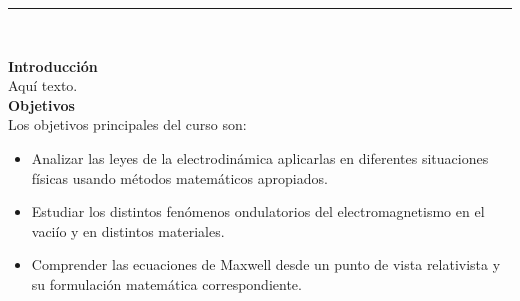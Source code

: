 \documentclass[letterpaper,10pt,onecolumn]{article}
\begin{document}




\noindent\rule{\textwidth}{1pt}\\[-0.1cm]

\addtocounter{mysection}{1}

\noindent\textbf{\large {} \quad Introducci\'on}\\[-0.2cm]


\noindent\normalsize Aqu\'i texto.\\[0.1cm]

\noindent\textbf{\large {} \quad Objetivos}\\[-0.2cm]

\noindent\normalsize Los objetivos principales del curso son:

\begin{itemize}
	\item Analizar las leyes de la electrodin\'amica aplicarlas en
          diferentes situaciones f\'isicas usando m\'etodos
          matem\'aticos apropiados.\\[-0.6cm] 
	\item Estudiar los distintos fen\'omenos ondulatorios del
          electromagnetismo en el vaci\'io y en distintos
          materiales.\\[-0.6cm] 
	\item Comprender las ecuaciones de Maxwell desde un punto de
          vista relativista y su formulaci\'on matem\'atica
          correspondiente.\\[-0.2cm] 
\end{itemize}
\end{document}

